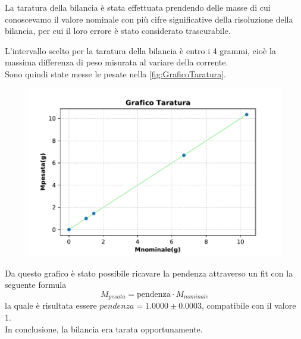 {\fontsize{11}{14}\selectfont 

La taratura della bilancia è stata effettuata  prendendo delle masse di cui conoscevamo il valore nominale con più cifre significative della risoluzione della bilancia, per cui il loro errore è stato considerato trascurabile. 
\par
L'intervallo scelto per la taratura della bilancia è entro i 4 grammi, cioè la massima differenza di peso misurata al variare della corrente.
\\
Sono quindi state messe le pesate nella \autoref{fig:GraficoTaratura}.
\par
\begin{figure}[H]
  \centering
  \includegraphics[width=13.5cm]{Figures/Grafico_Taratura.pdf}
  \caption{}   
  \label{fig:GraficoTaratura}
\end{figure}
\par
Da questo grafico è stato possibile ricavare la pendenza attraverso un fit con la seguente formula
\begin{equation*}
    M_{pesata} = \text{pendenza}\cdot M_{nominale}
\end{equation*}
la quale è risultata essere $pendenza = 1.0000 \pm 0.0003$, compatibile con il valore 1. 
\\
In conclusione, la bilancia era tarata opportunamente.
\par}